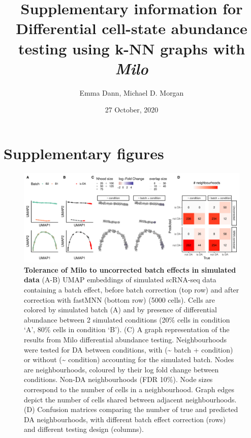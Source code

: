 \documentclass[
]{article}
\title{Supplementary information for
\textbf{Differential cell-state abundance testing using k-NN graphs with \emph{Milo}}}
\author{Emma Dann, Michael D. Morgan}
\date{27 October, 2020}
\begin{document}
\maketitle

{
\setcounter{tocdepth}{3}
\tableofcontents
}
\renewcommand{\figurename}{Supplementary Figure}

\newpage

\hypertarget{supplementary-figures}{%
\section{Supplementary figures}\label{supplementary-figures}}

\begin{figure}
\centering
\includegraphics{suppl_figs/suppl_fig1.pdf}
\caption{\label{fig:sup-fig-1}\textbf{Tolerance of Milo to uncorrected batch effects in simulated data}
(A-B) UMAP embeddings of simulated scRNA-seq data containing a batch effect, before batch correction (top row) and after correction with fastMNN (bottom row) (5000 cells). Cells are colored by simulated batch (A) and by presence of differential abundance between 2 simulated conditions (20\% cells in condition `A', 80\% cells in condition `B').
(C) A graph representation of the results from Milo differential abundance testing. Neighbourhoods were tested for DA between conditions, with (\textasciitilde{} batch + condition) or without (\textasciitilde{} condition) accounting for the simulated batch. Nodes are neighbourhoods, coloured by their log fold change between conditions. Non-DA neighbourhoods (FDR 10\%). Node sizes correspond to the number of cells in a neighbourhood. Graph edges depict the number of cells shared between adjacent neighbourhoods.
(D) Confusion matrices comparing the number of true and predicted DA neighbourhoods, with different batch effect correction (rows) and different testing design (columns).}
\end{figure}
\end{document}
